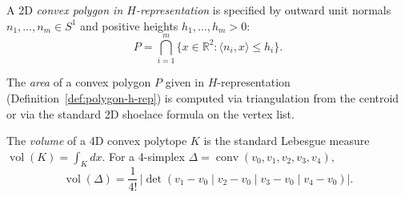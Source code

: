 \begin{unverified}
\begin{definition}\label{def:polygon-h-rep}
A 2D \emph{convex polygon in $H$-representation} is specified by
outward unit normals $n_1, \ldots, n_m \in S^1$ and positive
heights $h_1, \ldots, h_m > 0$:
\[
  P = \bigcap_{i=1}^{m} \{x \in \mathbb{R}^2 : \langle n_i, x \rangle \leq h_i\}.
\]
\end{definition}
\end{unverified}


\begin{unverified}
\begin{definition}\label{def:polygon-area}
The \emph{area} of a convex polygon $P$ given in $H$-representation
(Definition~\ref{def:polygon-h-rep}) is computed via triangulation
from the centroid or via the standard 2D shoelace formula on the vertex list.
\end{definition}
\end{unverified}



\begin{unverified}
\begin{definition}\label{def:volume}
The \emph{volume} of a 4D convex polytope $K$ is the standard
Lebesgue measure $\operatorname{vol}(K) = \int_K dx$.
For a 4-simplex $\Delta = \operatorname{conv}(v_0,v_1,v_2,v_3,v_4)$,
\[
  \operatorname{vol}(\Delta)
  = \frac{1}{4!}\,
    \left|\det(v_1 - v_0 \mid v_2 - v_0 \mid v_3 - v_0 \mid v_4 - v_0)\right|.
\]
\end{definition}
\end{unverified}

